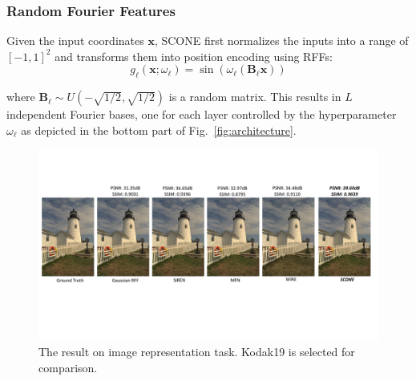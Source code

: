 \documentclass[letterpaper]{article} %
\begin{document}
\subsubsection{Random Fourier Features}
\label{subsubsec:method_rff}
Given the input coordinates $\mathbf{x}$, SCONE first normalizes the inputs into a range of $[-1, 1]^2$ and transforms them into position encoding using RFFs:
\begin{equation}
    g_{\ell}(\mathbf{x};\omega_{\ell}) = \sin(\omega_{\ell}(\mathbf{B_{\ell}x}))
\end{equation}

\noindent where $\mathbf{B_{\ell}}\sim U(-\sqrt{1/2}, \sqrt{1/2})$ is a random matrix. This results in $L$ independent Fourier bases, one for each layer controlled by the hyperparameter $\omega_{\ell}$ as depicted in the bottom part of Fig.~\ref{fig:architecture}.


\begin{figure}[th]
    \centering
    \includegraphics[width=2\columnwidth]{Figures/image_fitting.pdf}  
    \caption{The result on image representation task. Kodak19 is selected for comparison.}
    \label{fig:2d_results}
\end{figure}
\end{document}
